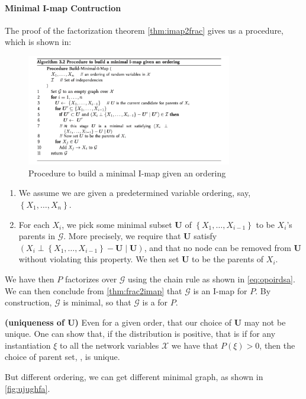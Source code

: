 \documentclass{article}
\newcommand{\bfs}[1]{\textbf{({#1}) }}
\begin{document}
\paragraph{Minimal I-map Contruction}\label{sec:jhdsddq}
 The proof of the factorization theorem \cref{thm:imap2frac} gives us a procedure, which is shown in:
\begin{figure}[H]
    \centering
    \includegraphics[width=0.8\textwidth]{Figs/a9.png}
    \caption{Procedure to build a minimal I-map given an ordering}
    \label{fig:imapminimal}
\end{figure}
\begin{enumerate}
    \item We assume we are given a predetermined variable ordering, say, $\left\{X_{1}, \ldots, X_{n}\right\}$.
    \item For each $X_{i}$, we pick some minimal subset $\boldsymbol{U}$ of $\left\{X_{1}, \ldots, X_{i-1}\right\}$ to be $X_{i}$'s parents in $\mathcal{G}$. More precisely, we require that $\boldsymbol{U}$ satisfy $\left(X_{i} \perp\left\{X_{1}, \ldots, X_{i-1}\right\}-\boldsymbol{U} \mid \boldsymbol{U}\right)$, and that no node can be removed from $\boldsymbol{U}$ without violating this property. We then set $\boldsymbol{U}$ to be the parents of $X_{i}$.
\end{enumerate}
We have then $P$ factorizes over $\mathcal{G}$ using the chain rule as shown in \cref{eq:opoirdsa}. We can then conclude from \cref{thm:frac2imap} that $\mathcal{G}$ is an I-map for $P$. By construction, $\mathcal{G}$ is minimal, so that $\mathcal{G}$ is a  for $P$.
\begin{rema}\bfs{uniqueness of $\boldsymbol{U}$}
Even for a given order, that our choice of $\boldsymbol{U}$ may not be unique. One can show that, if the distribution is positive, that is if for any instantiation $\xi$ to all the network variables $\mathcal{X}$ we have that $P(\xi)>0$, then the choice of parent set, , is unique. 
\end{rema}
\begin{exma}
But different ordering, we can get different  minimal graph, as shown in \cref{fig:ujughfa}.
\end{exma}
\end{document}
